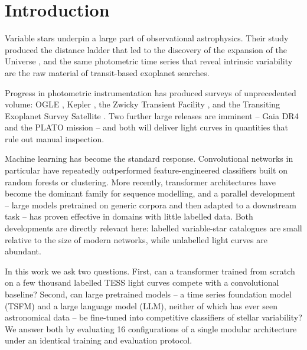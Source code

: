 \documentclass{aa}
\begin{document}

    \maketitle



    \section{Introduction}
    \label{sec:intro}

    Variable stars underpin a large part of observational astrophysics. Their study
    produced the distance ladder that led to the discovery of the expansion of the Universe
    \citep{Hubble1929}, and the same photometric time series that reveal intrinsic
    variability are the raw material of transit-based exoplanet searches.

    Progress in photometric instrumentation has produced surveys of unprecedented volume:
    OGLE \citep{Udalski2008}, Kepler \citep{Borucki2010}, the Zwicky Transient Facility
    \citep{Bellm2019}, and the Transiting Exoplanet Survey Satellite
    \citep[TESS,][]{Ricker2014}. Two further large releases are imminent -- Gaia DR4
    \citep{Prusti2016} and the PLATO mission \citep{Rauer2025} -- and both will deliver
    light curves in quantities that rule out manual inspection.

    Machine learning has become the standard response. Convolutional networks in particular
    have repeatedly outperformed feature-engineered classifiers built on random forests or
    clustering. More recently, transformer architectures \citep{Vaswani2017} have become the
    dominant family for sequence modelling, and a parallel development -- large models
    pretrained on generic corpora and then adapted to a downstream task -- has proven
    effective in domains with little labelled data. Both developments are directly relevant
    here: labelled variable-star catalogues are small relative to the size of modern
    networks, while unlabelled light curves are abundant.

    In this work we ask two questions. First, can a transformer trained from scratch on a
    few thousand labelled TESS light curves compete with a convolutional baseline? Second,
    can large pretrained models -- a time series foundation model (TSFM) and a large
    language model (LLM), neither of which has ever seen astronomical data -- be fine-tuned
    into competitive classifiers of stellar variability? We answer both by evaluating 16
    configurations of a single modular architecture under an identical training and
    evaluation protocol.
\end{document}
